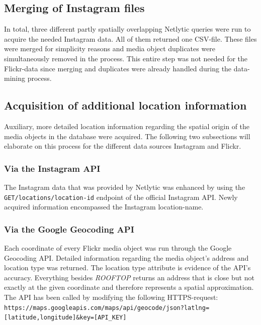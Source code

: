 \subsection{Merging of Instagram files} \label{netlytic_files_merge}
In total, three different partly spatially overlapping Netlytic queries were run to acquire the needed Instagram data. All of them returned one CSV-file. These files were merged for simplicity reasons and media object duplicates were simultaneously removed in the process. This entire step was not needed for the Flickr-data since merging and duplicates were already handled during the data-mining process.

\subsection{Acquisition of additional location information} \label{add_location_data}
Auxiliary, more detailed location information regarding the spatial origin of the media objects in the database were acquired. The following two subsections will elaborate on this process for the different data sources Instagram and Flickr.

\subsubsection{Via the Instagram API} \label{geolocation_via_instagramapi}
The Instagram data that was provided by Netlytic was enhanced by using the \\ \texttt{GET/locations/location-id} endpoint of the official Instagram API. Newly acquired information encompassed the Instagram location-name.

\subsubsection{Via the Google Geocoding API} \label{geocoding_api}
Each coordinate of every Flickr media object was run through the Google Geocoding API. Detailed information regarding the media object's address and location type was returned. The location type attribute is evidence of the API's accuracy. Everything besides \small{\textit{ROOFTOP}} returns an address that is close but not exactly at the given coordinate and therefore represents a spatial approximation. The API has been called by modifying the following HTTPS-request:\\
\texttt{\footnotesize{https://maps.googleapis.com/maps/api/geocode/json?latlng=[latitude,longitude]\&key=[API\_KEY]}}

